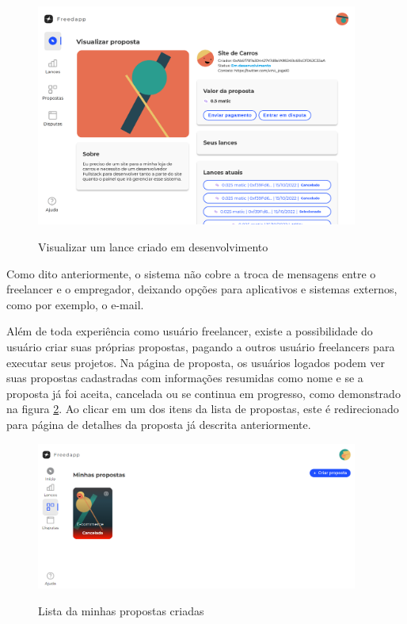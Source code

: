 \begin{figure}[!h]
  \centering
  \caption{Visualizar um lance criado em desenvolvimento}
  \includegraphics[width=400px]{src/images/app/proposal_details_creator_in_development.png}
  \label{fig:proposal_details_creator_in_development_fig}
\end{figure}

Como dito anteriormente, o sistema não cobre a troca de mensagens entre o freelancer e o empregador, deixando opções para aplicativos e sistemas externos, como por exemplo, o e-mail.

Além de toda experiência como usuário freelancer, existe a possibilidade do usuário criar suas próprias propostas, pagando a outros usuário freelancers para executar seus projetos. Na página de proposta, os usuários logados podem ver suas propostas cadastradas com informações resumidas como nome e se a proposta já foi aceita, cancelada ou se continua em progresso, como demonstrado na figura \ref{fig:proposal_list_fig}. Ao clicar em um dos itens da lista de propostas, este é redirecionado para página de detalhes da proposta já descrita anteriormente. 

\begin{figure}[!h]
  \centering
  \caption{Lista da minhas propostas criadas}
  \includegraphics[width=400px]{src/images/app/proposal_list.PNG}
  \label{fig:proposal_list_fig}
\end{figure}

